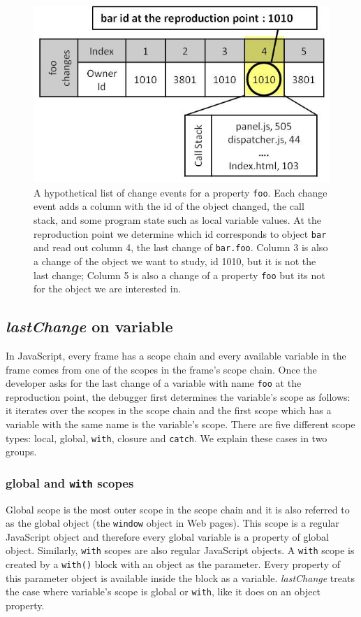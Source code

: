 \documentclass[runningheads,a4paper]{llncs}
\begin{document}
\begin{figure}[htp]
\centering 
\includegraphics[height=.2\textheight]{6-foo-changes1.jpg} 
\caption{A hypothetical list of  change events for a property \texttt{foo}. 
Each change event adds a column with the id of the object changed, the call stack,
and some program state such as local variable values. 
At the reproduction point  we determine which id  corresponds to 
object \texttt{bar} and read out column 4,  the last
  change of \texttt{bar.foo}. Column 3 is also a change of
  the object we want to study, id 1010, but it is not the last change;
  Column 5 is also a change of a property \texttt{foo} but its not for
  the object we are interested in.}
\label{fig:foo-changes1}
\end{figure}

\subsection{\textit{lastChange} on variable} 
In JavaScript, every frame has a scope chain and every available
variable in the frame comes from one of the scopes in the frame's
scope chain. Once the developer asks for the last change of a variable with name 
\texttt{foo} at the reproduction point, the debugger first determines the
variable's scope as follows: it iterates over the scopes in the scope
chain and the first scope which has a variable with the same name is
the variable's scope. There are five different scope types: local,
global, \texttt{with}, closure and \texttt{catch}. We explain these
cases in two groups.

\subsubsection{global and \texttt{with} scopes}
Global scope is the most outer scope in the scope chain and it is
also referred to as the global object (the \texttt{window}
object in Web pages). This scope is a regular JavaScript object and therefore every
global variable is a property of global object. Similarly,
 \texttt{with} scopes are also regular JavaScript objects. A \texttt{with}
scope is created by a \texttt{with()} block with an object as the
parameter. Every property of this parameter object is available inside the
block as a variable. \textit{lastChange} treats the case where variable's scope
is global or \texttt{with}, like it does on an object
property.
\end{document}
